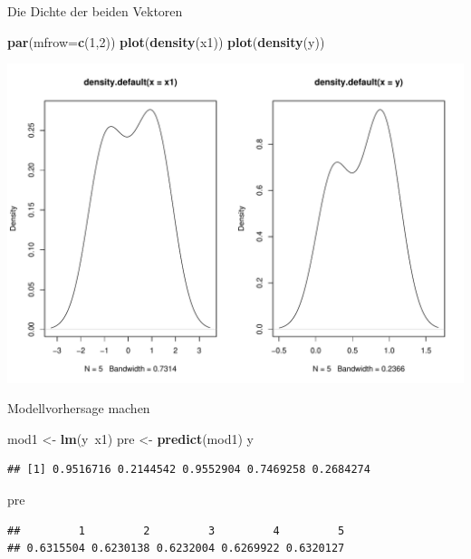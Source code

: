 \documentclass[ignorenonframetext,]{beamer}
\newenvironment{Shaded}{}{}
\newcommand{\KeywordTok}[1]{\textcolor[rgb]{0.00,0.44,0.13}{\textbf{{#1}}}}
\newcommand{\DataTypeTok}[1]{\textcolor[rgb]{0.56,0.13,0.00}{{#1}}}
\newcommand{\DecValTok}[1]{\textcolor[rgb]{0.25,0.63,0.44}{{#1}}}
\newcommand{\StringTok}[1]{\textcolor[rgb]{0.25,0.44,0.63}{{#1}}}
\newcommand{\NormalTok}[1]{{#1}}
\begin{document}
\begin{frame}[fragile]{Die Dichte der beiden Vektoren}

\begin{Shaded}
\begin{Highlighting}[]
\KeywordTok{par}\NormalTok{(}\DataTypeTok{mfrow=}\KeywordTok{c}\NormalTok{(}\DecValTok{1}\NormalTok{,}\DecValTok{2}\NormalTok{))}
\KeywordTok{plot}\NormalTok{(}\KeywordTok{density}\NormalTok{(x1))}
\KeywordTok{plot}\NormalTok{(}\KeywordTok{density}\NormalTok{(y))}
\end{Highlighting}
\end{Shaded}

\includegraphics{R_intern_files/figure-beamer/unnamed-chunk-303-1.pdf}

\end{frame}

\begin{frame}[fragile]{Modellvorhersage machen}

\begin{Shaded}
\begin{Highlighting}[]
\NormalTok{mod1 <-}\StringTok{ }\KeywordTok{lm}\NormalTok{(y~x1)}
\NormalTok{pre <-}\StringTok{ }\KeywordTok{predict}\NormalTok{(mod1)}
\NormalTok{y}
\end{Highlighting}
\end{Shaded}

\begin{verbatim}
## [1] 0.9516716 0.2144542 0.9552904 0.7469258 0.2684274
\end{verbatim}

\begin{Shaded}
\begin{Highlighting}[]
\NormalTok{pre}
\end{Highlighting}
\end{Shaded}

\begin{verbatim}
##         1         2         3         4         5 
## 0.6315504 0.6230138 0.6232004 0.6269922 0.6320127
\end{verbatim}

\end{frame}
\end{document}
